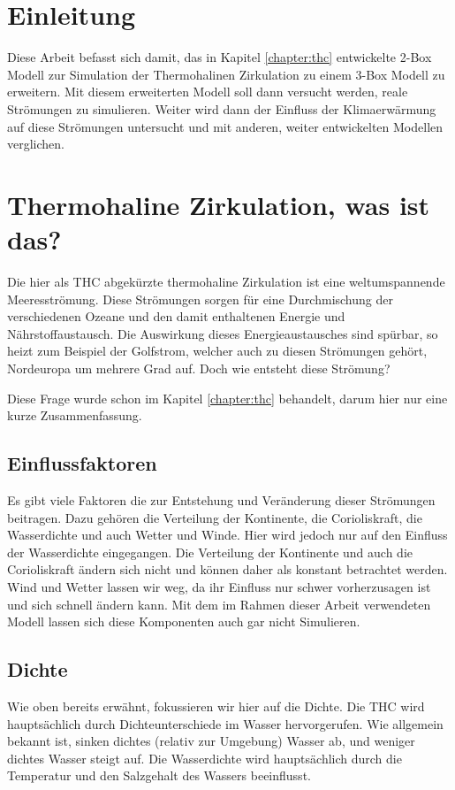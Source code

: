 \section{Einleitung}

Diese Arbeit befasst sich damit, das in Kapitel \ref{chapter:thc} entwickelte 2-Box Modell zur Simulation der Thermohalinen Zirkulation zu einem 3-Box Modell zu erweitern. Mit diesem erweiterten Modell soll dann versucht werden, reale Strömungen zu simulieren. Weiter wird dann der Einfluss der Klimaerwärmung auf diese Strömungen untersucht und mit anderen, weiter entwickelten Modellen verglichen.


\section{Thermohaline Zirkulation, was ist das?}

Die hier als THC abgekürzte thermohaline Zirkulation ist eine weltumspannende Meeresströmung.
Diese Strömungen sorgen für eine Durchmischung der verschiedenen Ozeane und den damit enthaltenen Energie und Nährstoffaustausch. 
Die Auswirkung dieses Energieaustausches sind spürbar, so heizt zum Beispiel der Golfstrom, welcher auch zu diesen Strömungen gehört, Nordeuropa um mehrere Grad auf.
Doch wie entsteht diese Strömung? 

Diese Frage wurde schon im Kapitel \ref{chapter:thc} behandelt, darum hier nur eine kurze Zusammenfassung. 



\subsection{Einflussfaktoren}
Es gibt viele Faktoren die zur Entstehung und Veränderung dieser Strömungen beitragen. Dazu gehören die Verteilung der Kontinente, die Corioliskraft, die Wasserdichte und auch Wetter und Winde. Hier wird jedoch nur auf den Einfluss der Wasserdichte eingegangen.
Die Verteilung der Kontinente und auch die Corioliskraft ändern sich nicht und können daher als konstant betrachtet werden. Wind und Wetter lassen wir weg, da ihr Einfluss nur schwer vorherzusagen ist und sich schnell ändern kann. Mit dem im Rahmen dieser Arbeit verwendeten Modell lassen sich diese Komponenten auch gar nicht Simulieren.

\subsection{Dichte}
Wie oben bereits erwähnt, fokussieren wir hier auf die Dichte.
Die THC wird hauptsächlich durch Dichteunterschiede im Wasser hervorgerufen.
Wie allgemein bekannt ist, sinken dichtes (relativ zur Umgebung) Wasser ab, und weniger dichtes Wasser steigt auf. Die Wasserdichte wird hauptsächlich durch die Temperatur und den Salzgehalt des Wassers beeinflusst.

